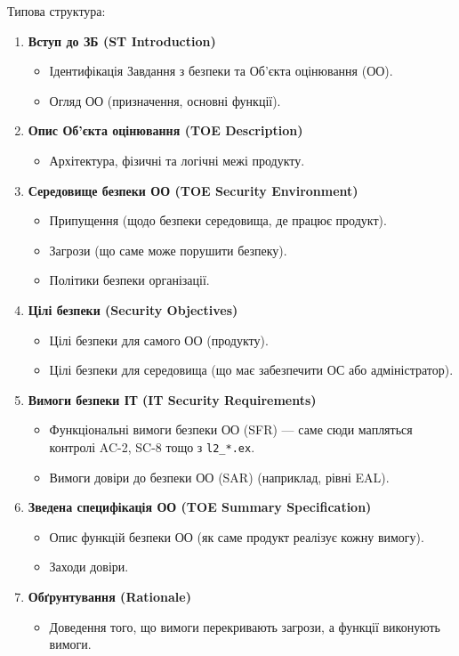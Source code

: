 \documentclass{article}
\begin{document}
Типова структура:
\begin{enumerate}
    \item \textbf{Вступ до ЗБ (ST Introduction)}
    \begin{itemize}
        \item Ідентифікація Завдання з безпеки та Об'єкта оцінювання (ОО).
        \item Огляд ОО (призначення, основні функції).
    \end{itemize}
    \item \textbf{Опис Об'єкта оцінювання (TOE Description)}
    \begin{itemize}
        \item Архітектура, фізичні та логічні межі продукту.
    \end{itemize}
    \item \textbf{Середовище безпеки ОО (TOE Security Environment)}
    \begin{itemize}
        \item Припущення (щодо безпеки середовища, де працює продукт).
        \item Загрози (що саме може порушити безпеку).
        \item Політики безпеки організації.
    \end{itemize}
    \item \textbf{Цілі безпеки (Security Objectives)}
    \begin{itemize}
        \item Цілі безпеки для самого ОО (продукту).
        \item Цілі безпеки для середовища (що має забезпечити ОС або адміністратор).
    \end{itemize}
    \item \textbf{Вимоги безпеки ІТ (IT Security Requirements)}
    \begin{itemize}
        \item Функціональні вимоги безпеки ОО (SFR) — саме сюди мапляться контролі AC-2, SC-8 тощо з \texttt{l2\_*.ex}.
        \item Вимоги довіри до безпеки ОО (SAR) (наприклад, рівні EAL).
    \end{itemize}
    \item \textbf{Зведена специфікація ОО (TOE Summary Specification)}
    \begin{itemize}
        \item Опис функцій безпеки ОО (як саме продукт реалізує кожну вимогу).
        \item Заходи довіри.
    \end{itemize}
    \item \textbf{Обґрунтування (Rationale)}
    \begin{itemize}
        \item Доведення того, що вимоги перекривають загрози, а функції виконують вимоги.
    \end{itemize}
\end{enumerate}
\end{document}
